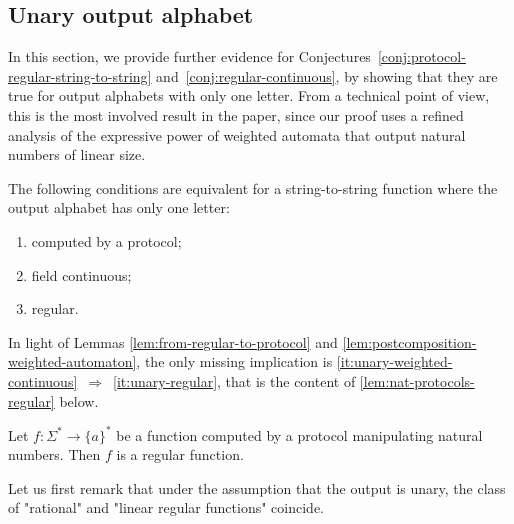 \subsection{Unary output alphabet}
\label{sec:unary-output-alphabet}
\AP
In this section, we provide further evidence for
Conjectures~\ref{conj:protocol-regular-string-to-string}
and~\ref{conj:regular-continuous}, by showing that they are true for output
alphabets with only one letter. From a technical point of view, this is the
most involved result in the paper, since our proof uses a refined analysis of
the expressive power of weighted automata that output natural numbers of linear
size.

\begin{theorem}\label{thm:unary-string-to-string}
    The following conditions are equivalent for  a string-to-string function where  the output alphabet  has only one letter:
    \begin{enumerate}
        \item computed by a protocol;
        \item \label{it:unary-weighted-continuous} field continuous;
        \item \label{it:unary-regular} regular.
    \end{enumerate}
\end{theorem}

In light of Lemmas \ref{lem:from-regular-to-protocol} and
\ref{lem:postcomposition-weighted-automaton}, the only missing implication is
\ref{it:unary-weighted-continuous}~$\Rightarrow$~\ref{it:unary-regular},
that is the content of \cref{lem:nat-protocols-regular} below.


\begin{lemma}
  \label{lem:nat-protocols-regular}
  Let $f : \Sigma^* \to \{a\}^*$ be a function computed by a protocol
  manipulating natural numbers. Then $f$ is a regular function.
\end{lemma}

Let us first remark that under the assumption that the output is unary,
the class of "rational" and "linear regular functions" coincide.

